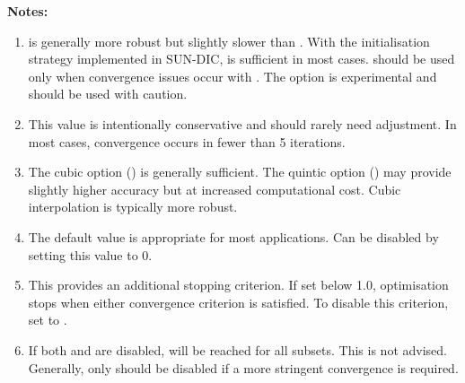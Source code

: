 \noindent
\textbf{Notes:}
\begin{enumerate}
	\item {}  is generally more robust but slightly slower than . With the initialisation strategy implemented in SUN-DIC,  is sufficient in most cases.  should be used only when convergence issues occur with . The  option is experimental and should be used with caution.
	
	\item {} This value is intentionally conservative and should rarely need adjustment. In most cases, convergence occurs in fewer than 5 iterations.
	
	\item {} The cubic option () is generally sufficient. The quintic option () may provide slightly higher accuracy but at increased computational cost. Cubic interpolation is typically more robust.
	
	\item {} The default value is appropriate for most applications.  Can be disabled by setting this value to 0.
	
	\item {} This provides an additional stopping criterion. If set below 1.0, optimisation stops when either convergence criterion is satisfied. To disable this criterion, set to .
	
	\item If both  and  are disabled,  will be reached for all subsets.  This is not advised.  Generally, only  should be disabled if a more stringent convergence is required.
	
\end{enumerate}
